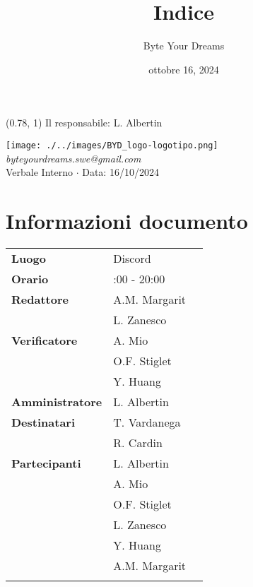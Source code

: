 \documentclass{article}
\title{\textbf{\fontsize{28}{6}\selectfont Indice}}
\author{\fontsize{14}{6}\selectfont Byte Your Dreams}
\date{ottobre 16, 2024}
\begin{document}
\begin{textblock*}{\textwidth}(0.78\textwidth, 1\textheight)
    Il responsabile: L. Albertin
\end{textblock*}
\pagestyle{fancy}
\begin{center}
\texttt{[image: ./../images/BYD\_logo-logotipo.png]} \\
\fontsize{12}{6}\textcolor[RGB]{60, 60, 60}{\textit{byteyourdreams.swe@gmail.com}} \\
\vspace{0.5cm}
\fontsize{16}{6}\selectfont Verbale Interno $\cdot$ Data: 16/10/2024 \\
\vspace{0.5cm}
\end{center}




\section*{Informazioni documento}
\def\arraystretch{1.2}
\begin{tabular}{>{\raggedleft\arraybackslash}p{}|>{\raggedright\arraybackslash}p{}c}
\hline
\addlinespace
\textbf{Luogo} & Discord \vspace{10pt} \\
\textbf{Orario} & 17:00 - 20:00 \vspace{10pt} \\
\textbf{Redattore} & A.M. Margarit\\ & L. Zanesco \vspace{10pt} \\
\textbf{Verificatore} & A. Mio \\ & O.F. Stiglet \\ & Y. Huang \vspace{10pt} \\
\textbf{Amministratore} & L. Albertin \vspace{10pt} \\
\textbf{Destinatari} & T. Vardanega \\ & R. Cardin \vspace{10pt} \\
\textbf{Partecipanti} & L. Albertin \\ & A. Mio \\ & O.F. Stiglet \\ & L. Zanesco \\ & Y. Huang\\ & A.M. Margarit \\\vspace{10pt} \\
\end{tabular}
\end{document}
